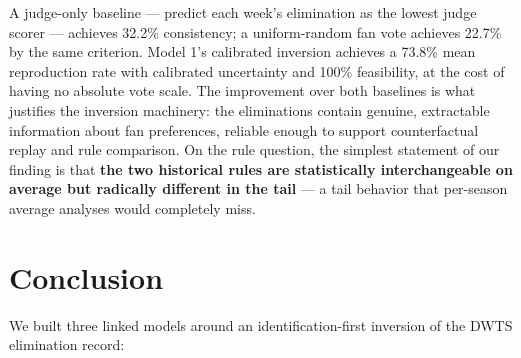 \documentclass[11pt]{article}
\begin{document}
A judge-only baseline --- predict each week's elimination as the lowest judge scorer ---
achieves 32.2\% consistency; a uniform-random fan vote achieves 22.7\% by the same
criterion. Model 1's calibrated inversion achieves a 73.8\% mean reproduction rate with
calibrated uncertainty and 100\% feasibility, at the cost of having no absolute vote
scale. The improvement over both baselines is what justifies the inversion machinery:
the eliminations contain genuine, extractable information about fan preferences,
reliable enough to support counterfactual replay and rule comparison. On the rule
question, the simplest statement of our finding is that \textbf{the two historical
rules are statistically interchangeable on average but radically different in the
tail} --- a tail behavior that per-season average analyses would completely miss.

\section{Conclusion}
\label{sec:conclusion}

We built three linked models around an identification-first inversion of the DWTS
elimination record:
\end{document}
